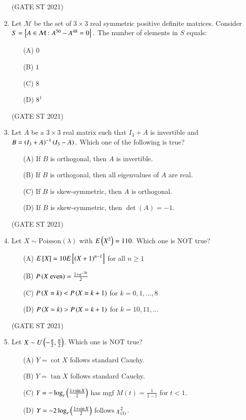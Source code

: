 \documentclass[journal,12pt,onecolumn]{IEEEtran}
\theoremstyle{remark}
\begin{document}
\begin{enumerate}
\hfill (GATE ST 2021) \\
\item
Let $\mathcal{M}$ be the set of $3\times 3$ real symmetric positive definite matrices. Consider  
$
S = \left\{ A \in \mathcal{M} : A^{50} - A^{48} = 0 \right\}.
$
The number of elements in $S$ equals:
\begin{enumerate}
\item[(A)] $0$
\item[(B)] $1$
\item[(C)] $8$
\item[(D)] $8^1$
\end{enumerate}

\hfill (GATE ST 2021) \\

\item
Let $A$ be a $3\times 3$ real matrix such that $I_3 + A$ is invertible and
$
B = \left(I_3 + A\right)^{-1}\left(I_3 - A\right).
$
Which one of the following is true?
\begin{enumerate}
\item[(A)] If $B$ is orthogonal, then $A$ is invertible.
\item[(B)] If $B$ is orthogonal, then all eigenvalues of $A$ are real.
\item[(C)] If $B$ is skew-symmetric, then $A$ is orthogonal.
\item[(D)] If $B$ is skew-symmetric, then $\det(A) = -1$.
\end{enumerate}

\hfill (GATE ST 2021) \\
\item
Let $X \sim \text{Poisson}(\lambda)$ with $E\left(X^2\right) = 110$. Which one is NOT true?
\begin{enumerate}
\item[(A)] $E{}\left[X\right] = 10 E{}\left[\left(X+1\right)^{n-1}\right]$ for all $n \ge 1$
\item[(B)] $P\left(X \ \text{even}\right) = \frac{1 + e^{-20}}{2}$
\item[(C)] $P\left(X = k\right) < P\left(X = k+1\right)$ for $k = 0, 1, \dots, 8$
\item[(D)] $P\left(X = k\right) > P\left(X = k+1\right)$ for $k = 10, 11, \dots$
\end{enumerate}

\hfill (GATE ST 2021) \\
\item
Let $
X \sim U\left(-\frac{\pi}{2}, \frac{\pi}{2}\right)$. Which one is NOT true?
\begin{enumerate}
\item[(A)] $Y = \cot X$ follows standard Cauchy.
\item[(B)] $Y = \tan X$ follows standard Cauchy.
\item[(C)] $Y = -\log_e \left(\frac{1+ \sin X}{2}\right)$ has mgf $M(t) = \frac{1}{1-t}$ for $t<1$.
\item[(D)] $Y = -2\log_e\left( \frac{1 + \sin X}{2} \right)$ follows $\chi^2_{\left(1\right)}$.
\end{enumerate}


\end{enumerate}
\end{document}
